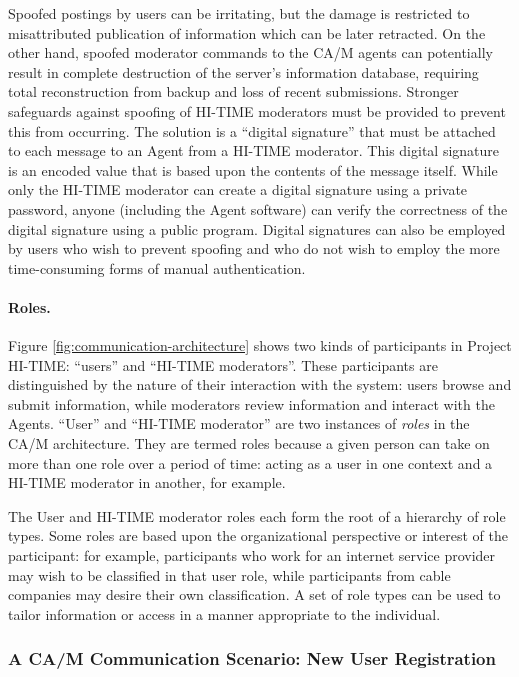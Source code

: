 Spoofed postings by users can be irritating, but the damage is restricted
to misattributed publication of information which can be later
retracted. On the other hand, spoofed moderator commands to the CA/M agents
can potentially result in complete destruction of the server's information
database, requiring total reconstruction from backup and loss of recent
submissions.  Stronger safeguards against spoofing of HI-TIME moderators
must be provided to prevent this from occurring.  The solution is a
``digital signature'' that must be attached to each message to an Agent
from a HI-TIME moderator.  This digital signature is an encoded value that
is based upon the contents of the message itself.  While only the HI-TIME
moderator can create a digital signature using a private password, anyone
(including the Agent software) can verify the correctness of the digital
signature using a public program.  Digital signatures can also be employed
by users who wish to prevent spoofing and who do not wish to employ the
more time-consuming forms of manual authentication.


\paragraph{Roles.}  Figure \ref{fig:communication-architecture} shows 
two kinds of participants in Project HI-TIME: ``users'' and ``HI-TIME
moderators''.  These participants are distinguished by the nature of their
interaction with the system: users browse and submit information, while
moderators review information and interact with the Agents.  ``User'' and
``HI-TIME moderator'' are two instances of {\em roles\/} in the CA/M
architecture.  They are termed roles because a given person can take on
more than one role over a period of time: acting as a user in one context
and a HI-TIME moderator in another, for example.

The User and HI-TIME moderator roles each form the root of a hierarchy of
role types.  Some roles are based upon the organizational perspective or
interest of the participant: for example, participants who work for an
internet service provider may wish to be classified in that user role,
while participants from cable companies may desire their own
classification.  A set of role types can be used to tailor information or
access in a manner appropriate to the individual.

\subsubsection{A CA/M Communication Scenario: New User Registration}

